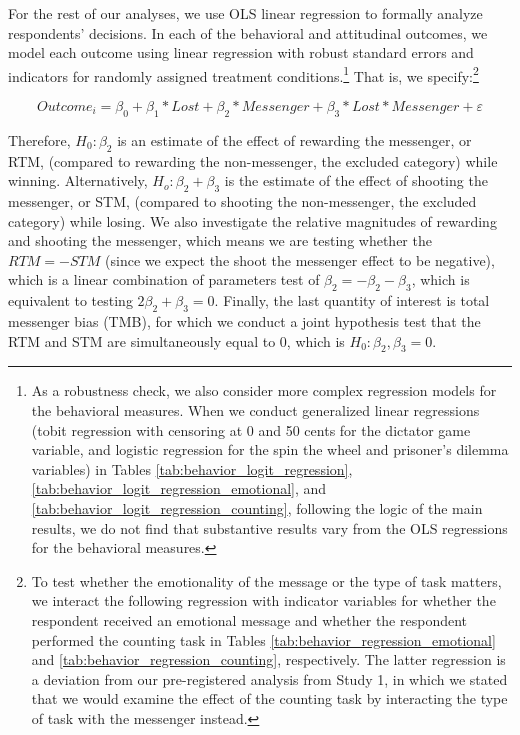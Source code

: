 For the rest of our analyses, we use OLS linear regression to formally
analyze respondents' decisions. In each of the behavioral and attitudinal
outcomes, we model each outcome using linear regression with robust
standard errors and indicators for randomly assigned treatment
conditions.\footnote{As a robustness check, we also consider
more complex regression models for the behavioral measures. 
When we conduct generalized linear regressions (tobit regression with censoring at 0 and 50 cents for the dictator game variable, 
and logistic regression for the spin the wheel and prisoner’s dilemma variables)
in Tables \ref{tab:behavior_logit_regression}, 
\ref{tab:behavior_logit_regression_emotional}, and \ref{tab:behavior_logit_regression_counting}, following 
the logic of the main results, 
we do not find that substantive results vary from the OLS regressions for the behavioral measures.} 
That is, we specify:\footnote{To test whether the emotionality of the message or the type of task matters,
we interact the following regression with indicator variables for whether the respondent received an
emotional message and whether the respondent performed the counting task in Tables \ref{tab:behavior_regression_emotional}
and \ref{tab:behavior_regression_counting}, respectively. The latter regression is a deviation from our
pre-registered analysis from Study 1, in which we stated that we would examine the effect of the counting task
by interacting the 
type of task with the messenger instead.}

\[{Outcome}_{i} = \beta_{0} + \beta_{1}*Lost  + \beta_{2}*Messenger + \beta_{3}*Lost*Messenger + \varepsilon\]

Therefore, $H_0\colon \beta_2$ is an estimate of the effect
of rewarding the messenger, or RTM, (compared to rewarding the
non-messenger, the excluded category) while winning. Alternatively,
$H_o\colon \beta_2 + \beta_3$ is the estimate of the
effect of shooting the messenger, or STM, (compared to shooting the
non-messenger, the excluded category) while losing. We also investigate the relative magnitudes of rewarding and shooting the messenger, which
means we are testing whether the $RTM = -STM$ (since we expect the shoot
the messenger effect to be negative), which is a linear combination of
parameters test of $\beta_2 = -\beta_2 -
\beta_3$, which is equivalent to testing
$2\beta_2 + \beta_3 = 0$. Finally, the last quantity of interest is total
messenger bias (TMB), for which we conduct a joint hypothesis test that the RTM
and STM are simultaneously equal to 0, which is $H_0\colon \beta_2,
\beta_3 = 0$. 

